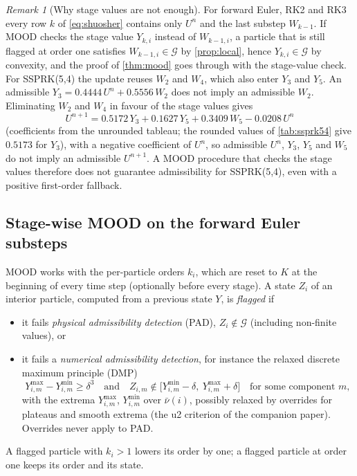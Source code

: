 \documentclass[11pt,a4paper]{article}
\theoremstyle{plain}
\theoremstyle{definition}
\theoremstyle{remark}
\newtheorem{remark}[theorem]{Remark}
\numberwithin{equation}{section}
\newcommand{\cnb}{\bar\nu}
\newcommand{\Ad}{\mathcal{G}}
\begin{document}
\begin{remark}[Why stage values are not enough]\label{rem:stagevalues}
For forward Euler, RK2 and RK3 every row $k$ of \eqref{eq:shuosher} contains only $U^n$ and the last substep $W_{k-1}$. If MOOD checks the stage value $Y_{k,i}$ instead of $W_{k-1,i}$, a particle that is still flagged at order one satisfies $W_{k-1,i}\in\Ad$ by \cref{prop:local}, hence $Y_{k,i}\in\Ad$ by convexity, and the proof of \cref{thm:mood} goes through with the stage-value check. For SSPRK(5,4) the update reuses $W_2$ and $W_4$, which also enter $Y_3$ and $Y_5$. An admissible $Y_3=0.4444\,U^n+0.5556\,W_2$ does not imply an admissible $W_2$. Eliminating $W_2$ and $W_4$ in favour of the stage values gives
\[
U^{n+1}=0.5172\,Y_3+0.1627\,Y_5+0.3409\,W_5-0.0208\,U^n
\]
(coefficients from the unrounded tableau; the rounded values of \cref{tab:ssprk54} give $0.5173$ for $Y_3$), with a negative coefficient of $U^n$, so admissible $U^n$, $Y_3$, $Y_5$ and $W_5$ do not imply an admissible $U^{n+1}$. A MOOD procedure that checks the stage values therefore does not guarantee admissibility for SSPRK(5,4), even with a positive first-order fallback.
\end{remark}

\subsection{Stage-wise MOOD on the forward Euler substeps}\label{sec:stagemood}

MOOD works with the per-particle orders $k_i$, which are reset to $K$ at the beginning of every time step (optionally before every stage). A state $Z_i$ of an interior particle, computed from a previous state $Y$, is \emph{flagged} if
\begin{itemize}
\item it fails \emph{physical admissibility detection} (PAD), $Z_i\notin\Ad$ (including non-finite values), or
\item it fails a \emph{numerical admissibility detection}, for instance the relaxed discrete maximum principle (DMP) \cite{Clain2011}
\begin{equation}\label{eq:dmp}
Y^{\max}_{i,m}-Y^{\min}_{i,m}\ge\delta^3\quad\text{and}\quad Z_{i,m}\notin\big[Y^{\min}_{i,m}-\delta,\ Y^{\max}_{i,m}+\delta\big]\quad\text{for some component } m,
\end{equation}
with the extrema $Y^{\max}_{i,m}$, $Y^{\min}_{i,m}$ over $\cnb(i)$, possibly relaxed by overrides for plateaus and smooth extrema (the u2 criterion of the companion paper). Overrides never apply to PAD.
\end{itemize}
A flagged particle with $k_i>1$ lowers its order by one; a flagged particle at order one keeps its order and its state.
\end{document}
